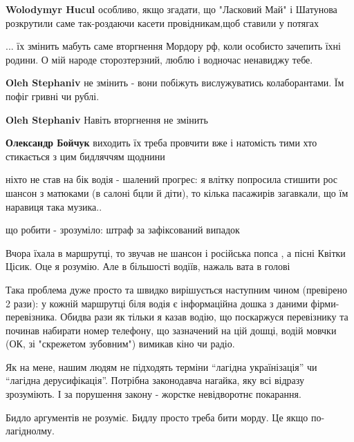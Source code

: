 \begin{itemize}
\textbf{Wolodymyr Hucul} особливо, якщо згадати, що "Ласковий Май" і Шатунова розкрутили саме так-роздаючи касети провідникам,щоб ставили у потягах


... їх змінить мабуть саме вторгнення Мордору рф, коли особисто зачепить їхні родини.
О мій народе сторозтерзний,
люблю і водночас ненавиджу тебе.

\begin{itemize} %
\textbf{Oleh Stephaniv} не змінить - вони побіжуть вислужуватись колаборантами. Їм пофіг гривні чи рублі.

\textbf{Oleh Stephaniv}
Навіть вторгнення не змінить

\textbf{Олександр Бойчук} виходить їх треба провчити вже і натомість тими хто стикається з цим бидляччям щоднини
\end{itemize} %


ніхто не став на бік водія - шалений прогрес: я влітку попросила стишити рос
шансон з матюками (в салоні бцли й діти), то кілька пасажирів загавкали, що їм
наравиця така музика..

що робити - зрозуміло: штраф за зафіксований випадок



Вчора їхала в маршрутці, то звучав не шансон і російська попса , а пісні Квітки
Цісик. Оце я розумію. Але в більшості водіїв, нажаль вата в голові



Така проблема дуже просто та швидко вирішується наступним чином (превірено 2
рази): у кожній маршрутці біля водія є інформаційна дошка з даними
фірми-перевізника. Обидва рази як тільки я казав водію, що поскаржуся
перевізнику та починав набирати номер телефону, що зазначений на цій дошці,
водій мовчки (ОК, зі "скрежетом зубовним") вимикав кіно чи радіо.


Як на мене, нашим людям не підходять терміни \enquote{лагідна українізація} чи \enquote{лагідна
дерусифікація}. Потрібна законодавча нагайка, яку всі відразу зрозуміють. І за
порушення закону - жорстке невідворотнє покарання.


Бидло аргументів не розуміє. Бидлу просто треба бити морду. Це якщо по-лагіднолму.


\end{itemize}
